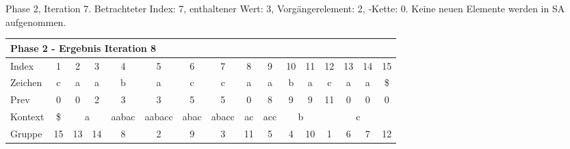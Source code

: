 \begin{table}[H]
\caption[Phase 2, Iteration 7]{Phase 2, Iteration 7. Betrachteter Index: 7, enthaltener Wert: 3, Vorgängerelement: 2, \prevpointer-Kette: 0. Keine neuen Elemente werden in SA aufgenommen.}
\label{table_complex_example_2_7} 
\end{table}

\begin{table}[H]
\centering
\begin{adjustbox}{max width=\textwidth}
\centering
\begin{tabular}{lccccccccccccccc}
\multicolumn{16}{l}{Phase 2 - Ergebnis Iteration 8}                                                                                                                                                                                                                                                                                                                   \\ \hline
\multicolumn{1}{l|}{Index}   & 1                       & 2  & 3                       & 4                          & 5                           & 6                         & 7                          & 8                                               & 9                        & 10                         & 11                      & 12  & 13  & 14  & 15  \\
\multicolumn{1}{l|}{Zeichen} & c                       & a  & a                       & b                          & a                           & c                         & c                          & a                                               & a                        & b                          & a                       & c   & a   & a   & \$  \\
\multicolumn{1}{l|}{Prev}    & 0                       & 0  & 2                       & 3                          & 3                           & 5                         & 5                          & 0                                               & 8                        & 9                          & 9                       & 11  & 0   & 0   & 0   \\ \hline
\multicolumn{1}{l|}{Kontext} & \multicolumn{1}{c|}{\$} & \multicolumn{2}{c|}{a}       & \multicolumn{1}{c|}{aabac} & \multicolumn{1}{c|}{aabacc} & \multicolumn{1}{c|}{abac} & \multicolumn{1}{c|}{abacc} & \multicolumn{1}{c|}{ac}                         & \multicolumn{1}{c|}{acc} & \multicolumn{2}{c|}{b}                               & \multicolumn{4}{c}{c} \\
\multicolumn{1}{l|}{Gruppe}  & \multicolumn{1}{c|}{15} & 13 & \multicolumn{1}{c|}{14} & \multicolumn{1}{c|}{8}     & \multicolumn{1}{c|}{2}      & \multicolumn{1}{c|}{9}    & \multicolumn{1}{c|}{3}     & \multicolumn{1}{c|}{11}                         & \multicolumn{1}{c|}{5}   & 4                          & \multicolumn{1}{c|}{10} & 1   & 6   & 7   & 12  \\

\end{tabular}
\end{adjustbox}
\end{table}
